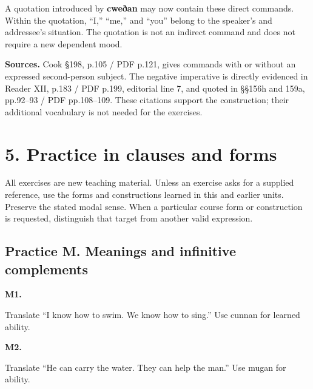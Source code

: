 A quotation introduced by \textbf{cweðan} may now contain these direct commands. Within the quotation, “I,” “me,” and “you” belong to the speaker’s and addressee’s situation. The quotation is not an indirect command and does not require a new dependent mood.

\textbf{Sources.} Cook §198, p.105 /\allowbreak{} PDF p.121, gives commands with or without an expressed second-person subject. The negative imperative is directly evidenced in Reader XII, p.183 /\allowbreak{} PDF p.199, editorial line 7, and quoted in §§156h and 159a, pp.92–93 /\allowbreak{} PDF pp.108–109. These citations support the construction; their additional vocabulary is not needed for the exercises.

\section*{5. Practice in clauses and forms}

All exercises are new teaching material. Unless an exercise asks for a supplied reference, use the forms and constructions learned in this and earlier units. Preserve the stated modal sense. When a particular course form or construction is requested, distinguish that target from another valid expression.

\subsection*{Practice M. Meanings and infinitive complements}

\par\begin{minipage}{\linewidth}\raggedright
\textbf{M1.}

Translate “I know how to swim. We know how to sing.” Use cunnan for learned ability.

\end{minipage}\par\addvspace{4pt}

\par\begin{minipage}{\linewidth}\raggedright
\textbf{M2.}

Translate “He can carry the water. They can help the man.” Use mugan for ability.

\end{minipage}\par\addvspace{4pt}

